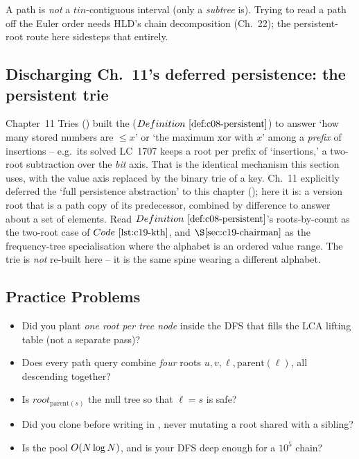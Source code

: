 \begin{warningbox}
A path is \emph{not} a \(tin\)-contiguous interval (only a \emph{subtree} is). Trying to read a path off the Euler order needs HLD's chain decomposition (Ch.~22); the persistent-root route here sidesteps that entirely.
\end{warningbox}

\subsection{Discharging Ch.~11's deferred persistence: the persistent trie}

\begin{insightbox}
Chapter~11 Tries () built the  (\(\defref{c08-persistent}\)) to answer `how many stored numbers are \(\le x\)' or `the maximum xor with \(x\)' among a \emph{prefix} of insertions -- e.g.\ its solved LC~1707 keeps a root per prefix of `insertions,' a two-root subtraction over the \emph{bit} axis. That is the identical mechanism this section uses, with the value axis replaced by the binary trie of a key. Ch.~11 explicitly deferred the `full persistence abstraction' to this chapter (); here it is: a version root that is a path copy of its predecessor, combined by difference to answer about a set of elements. Read \(\defref{c08-persistent}\)'s roots-by-count as the two-root case of \(\coderef{c19-kth}\), and \(\secref{c19-chairman}\) as the frequency-tree specialisation where the alphabet is an ordered value range. The trie is \emph{not} re-built here -- it is the same spine wearing a different alphabet.
\end{insightbox}

\subsection{Practice Problems}

\begin{stuckbox}
\begin{itemize}[nosep,leftmargin=1.4em]
  \item Did you plant \emph{one root per tree node} inside the DFS that fills the LCA lifting table (not a separate pass)?
  \item Does every path query combine \emph{four} roots \(u,v,\ell,\mathrm{parent}(\ell)\), all descending together?
  \item Is \(\mathit{root}_{\mathrm{parent}(s)}\) the null tree so that \(\ell=s\) is safe?
  \item Did you clone before writing in , never mutating a root shared with a sibling?
  \item Is the pool \(O(N\log N)\), and is your DFS deep enough for a \(10^5\) chain?
\end{itemize}
\end{stuckbox}

